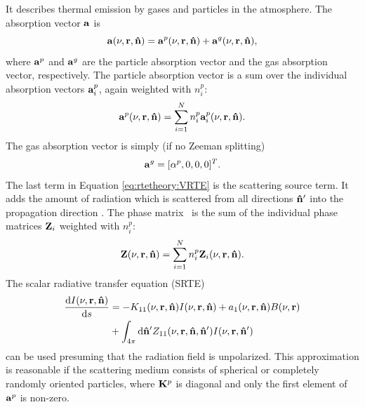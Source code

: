 It describes thermal emission by gases and particles in the atmosphere. The
absorption vector ${\bf a}$ is
\begin{equation}
  {\bf a}(\nu,{\bf r},{\bf \hat{n}})  =
  {\bf a}^{p}(\nu,{\bf r},{\bf \hat{n}}) +
  {\bf a}^{g}(\nu,{\bf r},{\bf \hat{n}}),
\end{equation}
where ${\bf a}^{p}$ and ${\bf a}^{g}$
are the particle absorption vector and the gas absorption vector,
respectively.  The particle absorption vector is a sum over the
individual absorption vectors ${\bf a}_i^p$, again
weighted with $n^p_i$:
\begin{equation}
  {\bf a}^{p}(\nu,{\bf r},{\bf \hat{n}}) = \sum_{i=1}^N n^p_i {\bf a}_i^p(\nu,{\bf r},{\bf \hat{n}}).
\label{eq:rtetheory:abs_vec_p}
\end{equation}
The gas absorption vector is simply (if no Zeeman splitting)
\begin{equation}
 {\bf a}^{g}  = [\alpha^p, 0, 0, 0]^T.
\end{equation}
The last term in Equation \ref{eq:rtetheory:VRTE} is the scattering source
term. It adds the amount of radiation which is scattered from all directions
${\bf \hat{n}}'$ into the propagation direction \PDir. The phase matrix \PhaMat\
is the sum of the individual phase matrices ${\bf Z}_i$ weighted with
$n^p_i$:
\begin{equation}
  {\bf Z}(\nu,{\bf r},{\bf \hat{n}}) = 
  \sum_{i=1}^N n^p_i {\bf Z}_i(\nu,{\bf r},{\bf \hat{n}}).
  \label{eq:rtetheory:pha_mat}
\end{equation}
The scalar radiative transfer equation (SRTE)
\begin{eqnarray}
  \label{eq:rtetheory:SRTE}
  \frac{\mathrm{d} I(\nu,{\bf r},{\bf \hat{n}})}{\mathrm{d} s}& = 
  -K_{11}(\nu,{\bf r},{\bf \hat{n}}) I(\nu,{\bf r},{\bf \hat{n}}) +
  a_1(\nu,{\bf r},{\bf \hat{n}}) B(\nu,{\bf r})   \nonumber\\
  &+\int_{4\pi} \mathrm{d} {\bf \hat{n}}' Z_{11}(\nu,{\bf r},{\bf \hat{n}},{\bf \hat{n}}') I(\nu,{\bf r},{\bf \hat{n}}')
\end{eqnarray}
can be used presuming that the radiation field is unpolarized. This
approximation is reasonable if the scattering medium consists of spherical or
completely randomly oriented particles, where ${\bf K}^p$ is diagonal and only
the first element of ${\bf a}^p$ is non-zero.


 
 

